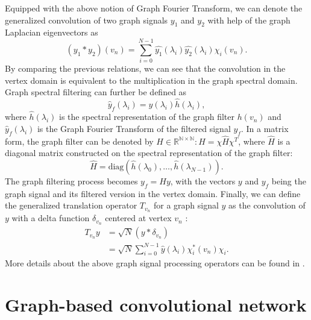 \documentclass[10pt,journal,compsoc]{IEEEtran}
\begin{document}
	Equipped with the above notion of Graph Fourier Transform, we can denote the generalized convolution of two graph signals $y_1$ and $y_2$ with help of the graph Laplacian eigenvectors as
	\begin{equation}
	(y_1 * y_2)(v_n) = \sum_{i=0}^{N-1} \hat{y_1}(\lambda_i) \hat{y_2}(\lambda_i) \chi_i (v_n).
	\label{eq:conv}
	\end{equation}
	By comparing the previous relations, we can see that the convolution in the vertex domain is equivalent to the multiplication in the graph spectral domain. Graph spectral filtering can further be defined as
	\begin{equation}
	\hat{y}_f(\lambda_i) = \hat{y}(\lambda_i) \hat{h}(\lambda_i), 
	\end{equation}
	where $\hat{h}(\lambda_i)$ is the spectral representation of the graph filter $h(v_n)$ and $\hat{y}_f(\lambda_i)$ is the Graph Fourier Transform of the filtered signal $y_f$. In a matrix form, the graph filter can be denoted by $H \in \mathbb{R^{N \times N}}: H=\chi \hat{H} \chi^T$, where $\hat{H}$ is a diagonal matrix constructed on the spectral representation of the graph filter:
	\begin{equation}
	\hat{H}=\mathrm{diag} (\hat{h}(\lambda_0), \dots, \hat{h}(\lambda_{N-1})).
	\label{eq:hatH}
	\end{equation}
	The graph filtering process becomes $y_f = H y $, with the vectors $y$ and $y_f$ being the graph signal and its filtered version in the vertex domain. Finally, we can define the generalized translation operator $T_{v_n}$ for a graph signal $y$ as the convolution of $y$ with a delta function $\delta_{v_n}$ centered at vertex $v_n$ \cite{bb:thanou2014learning}:
	\begin{equation}
	\begin{array}{rl}
	T_{v_n} y & = \sqrt{N}(y * \delta_{v_n}) \\
	& =\sqrt{N}\sum_{i=0}^{N-1}\hat{y}(\lambda_i)\chi_i^*(v_n)\chi_i .
	\end{array}
	\label{eq:transl}
	\end{equation}
	More details about the above graph signal processing operators can be found in \cite{bb:shuman2013emerging}.
	
	\section{Graph-based convolutional network}
	\label{s:overview}
	
\end{document}
